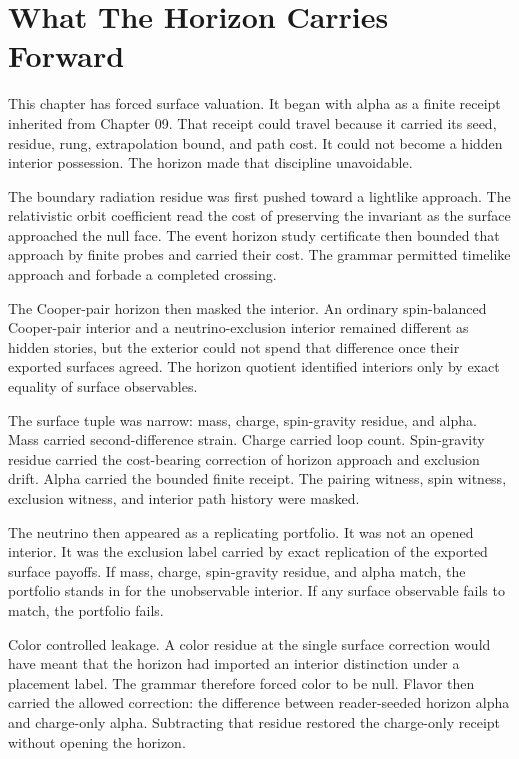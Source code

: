 \section{What The Horizon Carries Forward}

This chapter has forced surface valuation. It began with alpha as a finite
receipt inherited from Chapter 09. That receipt could travel because it
carried its seed, residue, rung, extrapolation bound, and path cost. It
could not become a hidden interior possession. The horizon made that
discipline unavoidable.

The boundary radiation residue was first pushed toward a lightlike
approach. The relativistic orbit coefficient read the cost of preserving the
invariant as the surface approached the null face. The event horizon study
certificate then bounded that approach by finite probes and carried their
cost. The grammar permitted timelike approach and forbade a completed
crossing.

The Cooper-pair horizon then masked the interior. An ordinary spin-balanced
Cooper-pair interior and a neutrino-exclusion interior remained different
as hidden stories, but the exterior could not spend that difference once
their exported surfaces agreed. The horizon quotient identified interiors
only by exact equality of surface observables.

The surface tuple was narrow: mass, charge, spin-gravity residue, and alpha.
Mass carried second-difference strain. Charge carried loop count.
Spin-gravity residue carried the cost-bearing correction of horizon
approach and exclusion drift. Alpha carried the bounded finite receipt. The
pairing witness, spin witness, exclusion witness, and interior path history
were masked.

The neutrino then appeared as a replicating portfolio. It was not an opened
interior. It was the exclusion label carried by exact replication of the
exported surface payoffs. If mass, charge, spin-gravity residue, and alpha
match, the portfolio stands in for the unobservable interior. If any surface
observable fails to match, the portfolio fails.

Color controlled leakage. A color residue at the single surface correction
would have meant that the horizon had imported an interior distinction under
a placement label. The grammar therefore forced color to be null. Flavor
then carried the allowed correction: the difference between reader-seeded
horizon alpha and charge-only alpha. Subtracting that residue restored the
charge-only receipt without opening the horizon.

